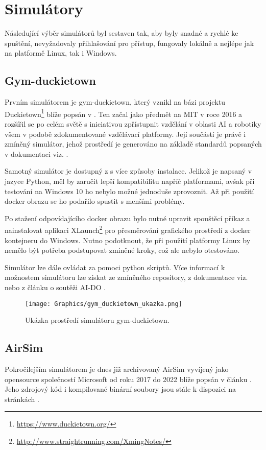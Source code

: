 \documentclass[czech, bc, kky, he, iso690numb]{fasthesis}
\begin{document}
    	\section{Simulátory}
    		Následující výběr simulátorů byl sestaven tak, aby byly snadné a rychlé ke spuštění, nevyžadovaly přihlašování pro přístup, fungovaly lokálně a nejlépe jak na platformě Linux, tak i Windows.
    		\subsection{Gym-duckietown}
    			Prvním simulátorem je gym-duckietown, který vznikl na bázi projektu Duckietown\footnote{\href{https://www.duckietown.org/}{https://www.duckietown.org/}} blíže popsán v \cite{Duckietown}. Ten začal jako předmět na MIT v roce 2016 a rozšířil se po celém světě s iniciativou zpřístupnit vzdělání v oblasti AI a robotiky všem v podobě zdokumentované vzdělávací platformy. Její součástí je právě i zmíněný simulátor, jehož prostředí je generováno na základě standardů popsaných v dokumentaci viz. \cite{duckietown_documentation}.
    			
    			Samotný simulátor je dostupný z \cite{gym_duckietown} s více způsoby instalace. Jelikož je napsaný v jazyce Python, měl by zaručit lepší kompatibilitu napříč platformami, avšak při testování na Windows 10 ho nebylo možné jednoduše zprovoznit. Až při použití docker obrazu se ho podařilo spustit s menšími problémy.
    			
    			Po stažení odpovídajícího docker obrazu bylo nutné upravit spouštěcí příkaz a nainstalovat aplikaci XLaunch\footnote{\href{http://www.straightrunning.com/XmingNotes/}{http://www.straightrunning.com/XmingNotes/}} pro přesměrování grafického prostředí z docker kontejneru do Windows. Nutno podotknout, že při použití platformy Linux by nemělo být potřeba podstupovat zmíněné kroky, což ale nebylo otestováno.
    			
    			Simulátor lze dále ovládat za pomoci python skriptů. Více informací k možnostem simulátoru lze získat ze zmíněného repository, z dokumentace viz. \cite{duckietown_documentation} nebo z článku o soutěži AI-DO \cite{AI-DO}.
	    			\begin{figure}[h]
	    				\centering
	    				\texttt{[image: Graphics/gym\_duckietown\_ukazka.png]}
	    				\caption{Ukázka prostředí simulátoru gym-duckietown.}
	    			\end{figure}
    			
    		\subsection{AirSim}
    			Pokročilejším simulátorem je dnes již archivovaný AirSim vyvíjený jako opensource společností Microsoft od roku 2017 do 2022 blíže popsán v článku \cite{airsim_paper}. Jeho zdrojový kód i kompilované binární soubory jsou stále k dispozici na stránkách \cite{airsim_github}.
    			
\end{document}
